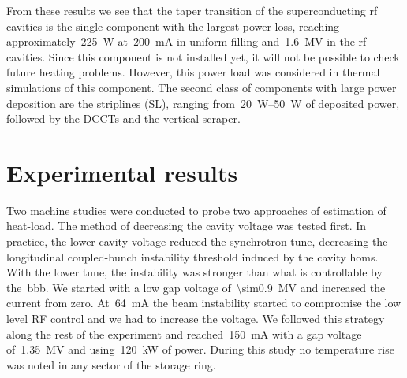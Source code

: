 \documentclass
[
    a4paper,
    nospread,     %
]{jacow}
\begin{document}
    From these results we see that the taper transition of the superconducting rf cavities is the single component with the largest power loss, reaching approximately~\SI{225}{\watt} at~\SI{200}{\milli\ampere} in uniform filling and~\SI{1.6}{\mega\volt} in the rf cavities. Since this component is not installed yet, it will not be possible to check future heating problems. However, this power load was considered in thermal simulations of this component. The second class of components with large power deposition are the striplines (SL), ranging from~\SIrange{20}{50}{\watt} of deposited power, followed by the DCCTs and the vertical scraper.

\section{Experimental results}

    Two machine studies were conducted to probe two approaches of estimation of heat-load. The method of decreasing the cavity voltage was tested first. In practice, the lower cavity voltage reduced the synchrotron tune, decreasing the longitudinal coupled-bunch instability threshold induced by the cavity \glspl{hom}. With the lower tune, the instability was stronger than what is controllable by the~\gls{bbb}. We started with a low gap voltage of~\SI{\sim0.9}{\mega\volt} and increased the current from zero. At~\SI{64}{\milli\ampere} the beam instability started to compromise the low level RF control and we had to increase the voltage. We followed this strategy along the rest of the experiment and reached~\SI{150}{\milli\ampere} with a gap voltage of~\SI{1.35}{\mega\volt} and using~\SI{120}{\kilo\watt} of power. During this study no temperature rise was noted in any sector of the storage ring.
    
\end{document}

